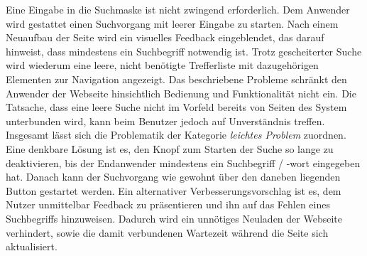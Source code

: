 {
	Eine Eingabe in die Suchmaske ist nicht zwingend erforderlich. Dem Anwender wird gestattet einen Suchvorgang mit leerer Eingabe zu starten. Nach einem Neuaufbau der Seite wird ein visuelles Feedback eingeblendet, das darauf hinweist, dass mindestens ein Suchbegriff notwendig ist. Trotz gescheiterter Suche wird wiederum eine leere, nicht benötigte Trefferliste mit dazugehörigen Elementen zur Navigation angezeigt.
}
{
	Das beschriebene Probleme schränkt den Anwender der Webseite hinsichtlich Bedienung und Funktionalität nicht ein. Die Tatsache, dass eine leere Suche nicht im Vorfeld bereits von Seiten des System unterbunden wird, kann beim Benutzer jedoch auf Unverständnis treffen. Insgesamt lässt sich die Problematik der Kategorie \emph{leichtes Problem} zuordnen.
}
{
	Eine denkbare Lösung ist es, den Knopf zum Starten der Suche so lange zu deaktivieren, bis der Endanwender mindestens ein Suchbegriff / -wort eingegeben hat. Danach kann der Suchvorgang wie gewohnt über den daneben liegenden Button gestartet werden. Ein alternativer Verbesserungsvorschlag ist es, dem Nutzer unmittelbar Feedback zu präsentieren und ihn auf das Fehlen eines Suchbegriffs hinzuweisen. Dadurch wird ein unnötiges Neuladen der Webseite verhindert, sowie die damit verbundenen Wartezeit während die Seite sich aktualisiert.
}

